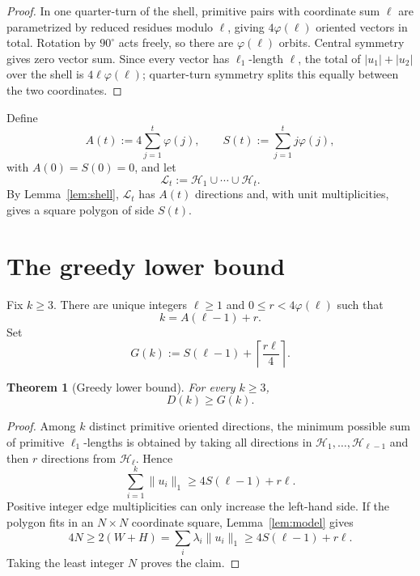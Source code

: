 \documentclass[11pt]{article}
\newtheorem{theorem}{Theorem}[section]
\theoremstyle{definition}
\newcommand{\HH}{\mathcal H}
\newcommand{\LL}{\mathcal L}
\newcommand{\ph}{\varphi}
\begin{document}
\begin{proof}
In one quarter-turn of the shell, primitive pairs with coordinate sum \(\ell\) are parametrized by reduced residues modulo \(\ell\), giving \(4\ph(\ell)\) oriented vectors in total.  Rotation by \(90^\circ\) acts freely, so there are \(\ph(\ell)\) orbits.  Central symmetry gives zero vector sum.  Since every vector has \(\ell_1\)-length \(\ell\), the total of \(|u_1|+|u_2|\) over the shell is \(4\ell\ph(\ell)\); quarter-turn symmetry splits this equally between the two coordinates.
\end{proof}

Define
\begin{equation}\label{eq:AS}
A(t):=4\sum_{j=1}^t\ph(j),\qquad
S(t):=\sum_{j=1}^t j\ph(j),
\end{equation}
with \(A(0)=S(0)=0\), and let
\[
\LL_t:=\HH_1\cup\cdots\cup\HH_t.
\]
By Lemma~\ref{lem:shell}, \(\LL_t\) has \(A(t)\) directions and, with unit multiplicities, gives a square polygon of side \(S(t)\).

\section{The greedy lower bound}

Fix \(k\ge3\).  There are unique integers \(\ell\ge1\) and
\(0\le r<4\ph(\ell)\) such that
\begin{equation}\label{eq:kr}
k=A(\ell-1)+r.
\end{equation}
Set
\begin{equation}\label{eq:G}
G(k):=S(\ell-1)+\left\lceil\frac{r\ell}{4}\right\rceil.
\end{equation}

\begin{theorem}[Greedy lower bound]\label{thm:greedy}
For every \(k\ge3\),
\[
D(k)\ge G(k).
\]
\end{theorem}

\begin{proof}
Among \(k\) distinct primitive oriented directions, the minimum possible sum of primitive \(\ell_1\)-lengths is obtained by taking all directions in
\(\HH_1,\ldots,\HH_{\ell-1}\) and then \(r\) directions from \(\HH_\ell\).  Hence
\[
\sum_{i=1}^k\|u_i\|_1\ge 4S(\ell-1)+r\ell.
\]
Positive integer edge multiplicities can only increase the left-hand side.  If the polygon fits in an \(N\times N\) coordinate square, Lemma~\ref{lem:model} gives
\[
4N\ge2(W+H)=\sum_i\lambda_i\|u_i\|_1
\ge4S(\ell-1)+r\ell.
\]
Taking the least integer \(N\) proves the claim.
\end{proof}
\end{document}
